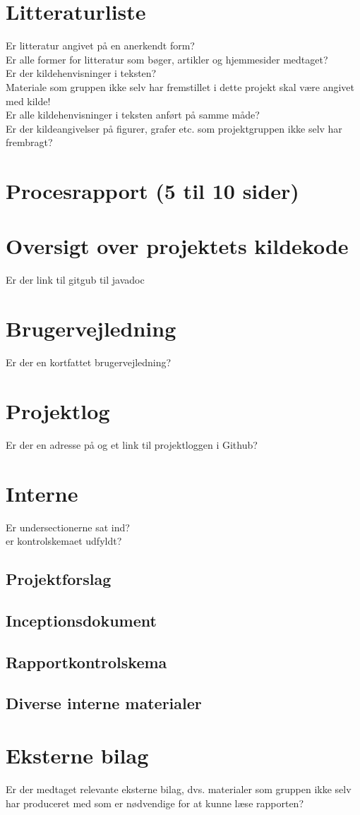 \documentclass[12pt]{article}
\begin{document}
\section{Litteraturliste}
Er litteratur angivet på en anerkendt form? \\
Er alle former for litteratur som bøger, artikler og hjemmesider medtaget? \\
Er der kildehenvisninger i teksten? \\
Materiale som gruppen ikke selv har fremstillet i dette projekt skal være angivet med kilde! \\
Er alle kildehenvisninger i teksten anført på samme måde? \\
Er der kildeangivelser på figurer, grafer etc. som projektgruppen ikke selv har frembragt? \\
\pagebreak
\section{Procesrapport (5 til 10 sider)}
\setcounter{page}{1}
\section{Oversigt over projektets kildekode}
Er der link til gitgub til javadoc
\section{Brugervejledning}
Er der en kortfattet brugervejledning?
\section{Projektlog}
Er der en adresse på og et link til projektloggen i Github?
\pagebreak
\section{Interne}
Er undersectionerne sat ind?\\
er kontrolskemaet udfyldt?
\subsection{Projektforslag}

\subsection{Inceptionsdokument}

\subsection{Rapportkontrolskema}
\pagebreak
\subsection{Diverse interne materialer}
\pagebreak
\clearpage
\section{Eksterne bilag}

\thispagestyle{empty}
Er der medtaget relevante eksterne bilag, dvs. materialer som gruppen ikke selv har produceret med som er nødvendige for at kunne læse rapporten?
\end{document}

